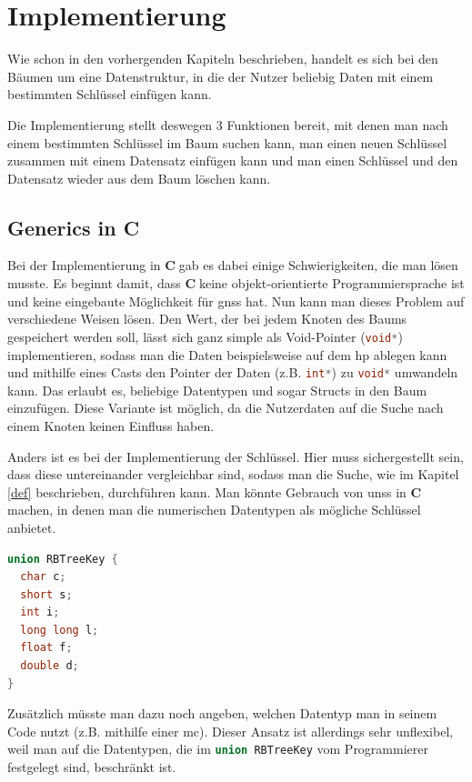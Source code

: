 \documentclass[11pt]{article}
\newcommand{\lstin}[1]{\lstinline[language=C]{#1}}
\newcommand{\cpl}{\textbf{C}$\;$}
\begin{document}
\pagebreak
\section{Implementierung} \label{impl}
Wie schon in den vorhergenden Kapiteln beschrieben, handelt es sich bei den Bäumen um eine Datenstruktur, in die der Nutzer beliebig Daten mit einem bestimmten Schlüssel einfügen kann.

Die Implementierung stellt deswegen 3 Funktionen bereit, mit denen man nach einem bestimmten Schlüssel im Baum suchen kann, man einen neuen Schlüssel zusammen mit einem Datensatz einfügen kann und man einen Schlüssel und den Datensatz wieder aus dem Baum löschen kann.

\subsection{Generics in C}
Bei der Implementierung in \cpl gab es dabei einige Schwierigkeiten, die man lösen musste. Es beginnt damit, dass \cpl keine objekt-orientierte Programmiersprache ist und keine eingebaute Möglichkeit für \glspl{gns} hat.
Nun kann man dieses Problem auf verschiedene Weisen lösen. Den Wert, der bei jedem Knoten des Baums gespeichert werden soll, lässt sich ganz simple als Void-Pointer (\lstin{void*}) implementieren, sodass man die Daten beispielsweise auf dem \gls{hp} ablegen kann
und mithilfe eines Casts den Pointer der Daten (z.B. \lstin{int*}) zu \lstin{void*} umwandeln kann. Das erlaubt es, beliebige Datentypen und sogar Structs in den Baum einzufügen.
Diese Variante ist möglich, da die Nutzerdaten auf die Suche nach einem Knoten keinen Einfluss haben.

Anders ist es bei der Implementierung der Schlüssel. Hier muss sichergestellt sein, dass diese untereinander vergleichbar sind, sodass man die Suche, wie im Kapitel \ref{def} beschrieben, durchführen kann.
Man könnte Gebrauch von \glspl{uns} in \cpl machen, in denen man die numerischen Datentypen als mögliche Schlüssel anbietet.

\begin{lstlisting}[language=C]
union RBTreeKey {
  char c;
  short s;
  int i;
  long long l;
  float f;
  double d;
}
\end{lstlisting}

Zusätzlich müsste man dazu noch angeben, welchen Datentyp man in seinem Code nutzt (z.B. mithilfe einer \gls{mc}). Dieser Ansatz ist allerdings sehr unflexibel, weil man auf die Datentypen, die im \lstin{union RBTreeKey} vom Programmierer festgelegt sind, beschränkt ist.
\end{document}
